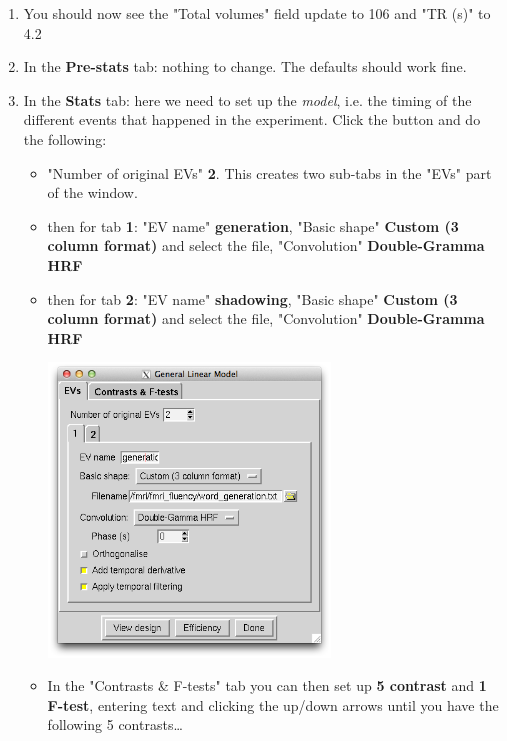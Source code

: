 \begin{enumerate}
\item You should now see the "Total volumes" field update to 106 and "TR (s)" to 4.2

\item In the \textbf{Pre-stats} tab: nothing to change. The defaults should work fine.

\item In the \textbf{Stats} tab: here we need to set up the \emph{model}, i.e. the timing of the different events that happened in the experiment. Click the  button and do the following:

    \begin{itemize}
    \item "Number of original EVs" \textbf{2}. This creates two sub-tabs in the "EVs" part of the window.
    \item then for tab  \textbf{1}: "EV name" \textbf{generation}, "Basic shape"  \textbf{Custom (3 column format)} and select the  file, "Convolution"  \textbf{Double-Gramma HRF}
     \item then for tab  \textbf{2}: "EV name" \textbf{shadowing}, "Basic shape"  \textbf{Custom (3 column format)} and select the  file, "Convolution"  \textbf{Double-Gramma HRF}
     
     \begin{center}
\includegraphics[width=7.5cm]{feat-evs.png}
	\end{center}
    
      \item In the "Contrasts \& F-tests" tab you can then set up \textbf{5 contrast} and \textbf{1 F-test}, entering text and clicking the up/down arrows until you have the following 5 contrasts\dots
   

\end{itemize}
\end{enumerate}
